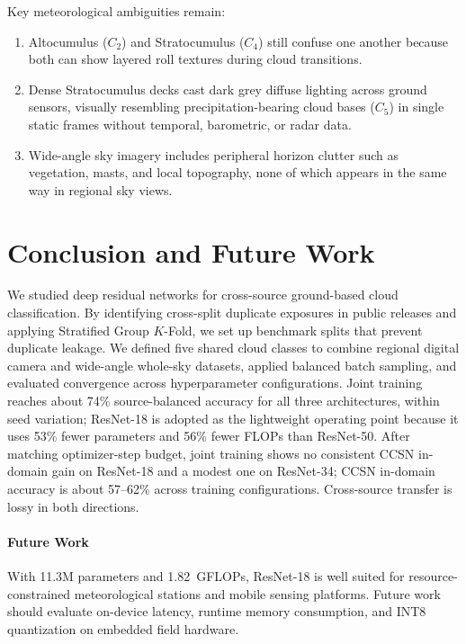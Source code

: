 \documentclass[11pt,a4paper]{article}
\begin{document}
Key meteorological ambiguities remain:
\begin{enumerate}[noitemsep, topsep=2pt]
    \item Altocumulus ($C_2$) and Stratocumulus ($C_4$) still confuse one another because both can show layered roll textures during cloud transitions.
    \item Dense Stratocumulus decks cast dark grey diffuse lighting across ground sensors, visually resembling precipitation-bearing cloud bases ($C_5$) in single static frames without temporal, barometric, or radar data.
    \item Wide-angle sky imagery includes peripheral horizon clutter such as vegetation, masts, and local topography, none of which appears in the same way in regional sky views.
\end{enumerate}

\section{Conclusion and Future Work}
\label{sec:conclusion}

We studied deep residual networks for cross-source ground-based cloud classification. By identifying cross-split duplicate exposures in public releases and applying Stratified Group $K$-Fold, we set up benchmark splits that prevent duplicate leakage. We defined five shared cloud classes to combine regional digital camera and wide-angle whole-sky datasets, applied balanced batch sampling, and evaluated convergence across hyperparameter configurations. Joint training reaches about 74\% source-balanced accuracy for all three architectures, within seed variation; ResNet-18 is adopted as the lightweight operating point because it uses 53\% fewer parameters and 56\% fewer FLOPs than ResNet-50. After matching optimizer-step budget, joint training shows no consistent CCSN in-domain gain on ResNet-18 and a modest one on ResNet-34; CCSN in-domain accuracy is about 57--62\% across training configurations. Cross-source transfer is lossy in both directions.

\paragraph{Future Work}
With 11.3M parameters and 1.82~GFLOPs, ResNet-18 is well suited for resource-constrained meteorological stations and mobile sensing platforms. Future work should evaluate on-device latency, runtime memory consumption, and INT8 quantization on embedded field hardware.
\end{document}
